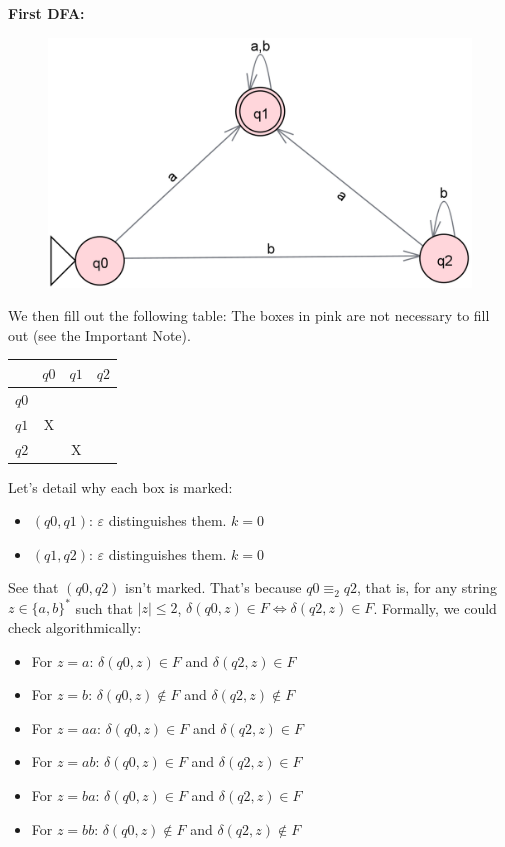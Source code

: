 \documentclass[12pt]{article}
\begin{document}
\bigskip\bigskip\bigskip\bigskip\bigskip\bigskip\bigskip\bigskip\bigskip\bigskip\bigskip\bigskip\bigskip\bigskip\bigskip

\textbf{First DFA:}

\begin{figure}[h]
    \centering
    \includegraphics[width=0.7\linewidth]{First_Automaton.png}
\end{figure}

We then fill out the following table: The boxes in pink are not necessary to fill out (see the Important Note).

\begin{center}
\begin{tabular}{|c|c|c|c|}
    \hline
    & $q0$ & $q1$ & $q2$ \\
    \hline
    $q0$ &\cellcolor{pink!50}&\cellcolor{pink!50}&\cellcolor{pink!50} \\
    $q1$ & X &\cellcolor{pink!50} &\cellcolor{pink!50} \\
    $q2$ & & X &\cellcolor{pink!50} \\
    \hline
\end{tabular}
\end{center}

Let's detail why each box is marked:
\begin{itemize}
    \item $(q0, q1)$: $\varepsilon$ distinguishes them. $k=0$
    \item $(q1, q2)$: $\varepsilon$ distinguishes them. $k=0$
\end{itemize}

See that $(q0, q2)$ isn't marked. That's because $q0 \equiv_2 q2$, that is, for any string $z \in \{a, b\}^*$ such that $|z| \leq 2$, $\delta(q0, z) \in F \iff \delta(q2, z) \in F$. Formally, we could check algorithmically:

\begin{itemize}
    \item For $z=a$: $\delta(q0, z) \in F$ and $\delta(q2, z) \in F$
    \item For $z=b$: $\delta(q0, z) \not\in F$ and $\delta(q2, z) \not\in F$
    \item For $z=aa$: $\delta(q0, z) \in F$ and $\delta(q2, z) \in F$
    \item For $z=ab$: $\delta(q0, z) \in F$ and $\delta(q2, z) \in F$
    \item For $z=ba$: $\delta(q0, z) \in F$ and $\delta(q2, z) \in F$
    \item For $z=bb$: $\delta(q0, z) \not\in F$ and $\delta(q2, z) \not\in F$
\end{itemize}
\end{document}
